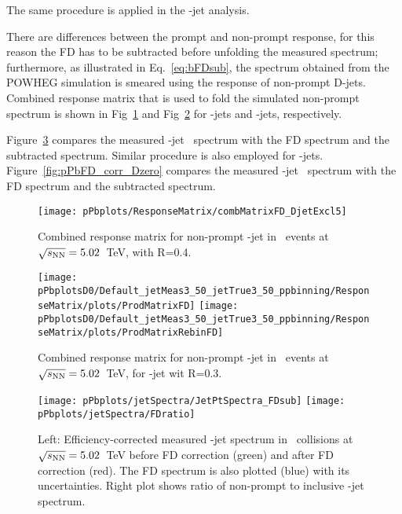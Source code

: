 The same procedure is applied in the \Dzero-jet analysis.

There are differences between the prompt and non-prompt response, for this reason the FD has to be subtracted before unfolding the measured spectrum; furthermore, as illustrated in Eq.~\ref{eq:bFDsub}, the spectrum obtained from the POWHEG simulation is smeared using the response of non-prompt D-jets. 
Combined response matrix that is used to fold the simulated non-prompt spectrum is shown in Fig~\ref{fig:pPb_ResponseMatrix_nonprompt_Dstar} and Fig~\ref{fig:pPb_ResponseMatrix_nonprompt_Dzero} for \Dstar-jets and \Dzero-jets, respectively.


Figure~\ref{fig:pPbFD_corr} compares the measured \Dstar-jet \pt\ spectrum with the FD spectrum and the subtracted spectrum.
Similar procedure is also employed for \Dzero-jets. %
Figure~\ref{fig:pPbFD_corr_Dzero} compares the measured \Dzero-jet \pt\ spectrum with the FD spectrum and the subtracted spectrum.

\begin{figure}[bth]
\centering
\texttt{[image: pPbplots/ResponseMatrix/combMatrixFD\_DjetExcl5]}
\caption{Combined response matrix for non-prompt \Dstar-jet in \pPb\ events at $\sqrt{s_{\rm NN}}=5.02$~TeV, with R=0.4.}
\label{fig:pPb_ResponseMatrix_nonprompt_Dstar}
\end{figure}

\begin{figure}[bth]
\centering
\texttt{[image: pPbplotsD0/Default\_jetMeas3\_50\_jetTrue3\_50\_ppbinning/ResponseMatrix/plots/ProdMatrixFD]}
\texttt{[image: pPbplotsD0/Default\_jetMeas3\_50\_jetTrue3\_50\_ppbinning/ResponseMatrix/plots/ProdMatrixRebinFD]}
\caption{Combined response matrix for non-prompt \Dzero-jet in \pPb\ events at $\sqrt{s_{\rm NN}}=5.02$~TeV, for \Dzero-jet wit R=0.3.}
\label{fig:pPb_ResponseMatrix_nonprompt_Dzero}
\end{figure}

\begin{figure}[bth]
\centering
\texttt{[image: pPbplots/jetSpectra/JetPtSpectra\_FDsub]}
\texttt{[image: pPbplots/jetSpectra/FDratio]}
\caption{Left: Efficiency-corrected measured \Dstar-jet spectrum in \pPb\ collisions at $\sqrt{s_{\rm NN}}=5.02$~TeV before FD correction (green) and after FD correction (red). The FD spectrum is also plotted (blue) with its uncertainties. Right plot shows ratio of non-prompt to inclusive \Dstar-jet spectrum.}
\label{fig:pPbFD_corr}
\end{figure}



